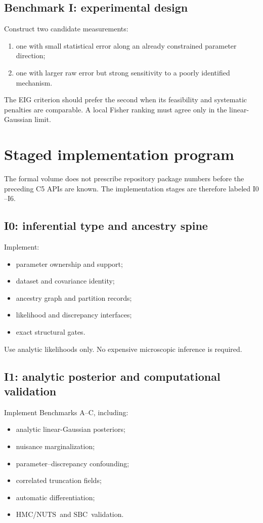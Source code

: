 \documentclass[11pt]{article}
\newcommand{\HMC}{\ensuremath{\mathrm{HMC}}}
\newcommand{\NUTS}{\ensuremath{\mathrm{NUTS}}}
\newcommand{\SBC}{\ensuremath{\mathrm{SBC}}}
\begin{document}
\subsection{Benchmark I: experimental design}

Construct two candidate measurements:
\begin{enumerate}
\item one with small statistical error along an already constrained parameter
direction;
\item one with larger raw error but strong sensitivity to a poorly identified
mechanism.
\end{enumerate}
The EIG criterion should prefer the second when its feasibility and systematic
penalties are comparable.  A local Fisher ranking must agree only in the
linear-Gaussian limit.

\section{Staged implementation program}
\label{sec:staging}

The formal volume does not prescribe repository package numbers before the
preceding C5 APIs are known.  The implementation stages are therefore labeled
\(\mathrm{I0}\)--\(\mathrm{I6}\).

\subsection{I0: inferential type and ancestry spine}

Implement:
\begin{itemize}
\item parameter ownership and support;
\item dataset and covariance identity;
\item ancestry graph and partition records;
\item likelihood and discrepancy interfaces;
\item exact structural gates.
\end{itemize}
Use analytic likelihoods only.  No expensive microscopic inference is required.

\subsection{I1: analytic posterior and computational validation}

Implement Benchmarks A--C, including:
\begin{itemize}
\item analytic linear-Gaussian posteriors;
\item nuisance marginalization;
\item parameter--discrepancy confounding;
\item correlated truncation fields;
\item automatic differentiation;
\item \HMC/\NUTS\ and \SBC\ validation.
\end{itemize}
\end{document}
